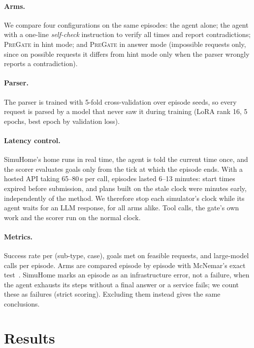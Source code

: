 \documentclass[sigconf]{aamas}
\newcommand{\sys}{\textsc{PreGate}}
\begin{document}
\paragraph{Arms.} We compare four configurations on the same episodes: the agent alone; the agent with a one-line
\emph{self-check} instruction to verify all times and report contradictions; \sys{} in hint mode; and \sys{} in
answer mode (impossible requests only, since on possible requests it differs from hint mode only when the parser
wrongly reports a contradiction).

\paragraph{Parser.} The parser is trained with 5-fold cross-validation over episode seeds, so every request is
parsed by a model that never saw it during training (LoRA rank 16, 5 epochs, best epoch by validation loss).

\paragraph{Latency control.} SimuHome's home runs in real time, the agent is told the current time once, and
the scorer evaluates goals only from the tick at which the episode ends. With a hosted API taking 65--80\,s per
call, episodes lasted 6--13 minutes: start times expired before submission, and plans built on the stale clock
were minutes early, independently of the method. We therefore stop each simulator's clock while its agent waits
for an LLM response, for all arms alike. Tool calls, the gate's own work and the scorer run on the normal clock.

\paragraph{Metrics.} Success rate per (sub-type, case), goals met on feasible requests, and large-model calls
per episode. Arms are compared episode by episode with McNemar's exact test~\cite{mcnemar1947}. SimuHome marks an
episode as an infrastructure error, not a failure, when the agent exhausts its steps without a final answer or
a service fails; we count these as failures (strict scoring). Excluding them instead gives the same conclusions.

\section{Results}
\end{document}
